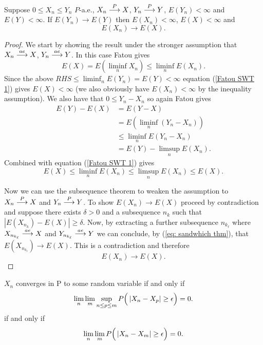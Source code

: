 \begin{theorem}
\label{thm: Probability Sandwich Theorem}
Suppose $0 \leq X_n \leq Y_n$ $P$-a.e.,  $X_n\overset{\small P} \longrightarrow X$,  $Y_n\overset{\small P} \longrightarrow Y$, $E(Y_n)<\infty$ and $E(Y)<\infty$. If  $E(Y_n) \rightarrow E(Y)$ then $E(X_n)<\infty$, $E(X)<\infty$ and 
\[E(X_n)\rightarrow E(X).\]
\end{theorem}
\begin{proof}

We start by  showing the result under the stronger assumption that $X_n\overset{\small ae} \longrightarrow X$,  $Y_n\overset{\small ae} \longrightarrow Y$. In this case Fatou gives
\begin{equation}
\label{Fatou SWT 1}
E(X) = E(\liminf_n X_n)\leq \liminf_n E(X_n).
\end{equation}
Since the above $ RHS \leq \liminf_n E(Y_n)=E(Y)<\infty$ equation (\ref{Fatou SWT 1}) gives $E(X)<\infty$ (we also obviously have $E(X_n)<\infty$ by the inequality assumption).
We also have that $0\leq Y_n -X_n$ so again Fatou gives
\begin{align*}
E(Y)-E(X) &= E(Y-X) \\
&= E(\liminf_n (Y_n-X_n)) \\
&\leq \liminf_n E(Y_n - X_n) \\
&= E(Y)-\limsup_n E(X_n). 
\end{align*}
Combined with equation (\ref{Fatou SWT 1}) gives
\begin{equation}
\label{eq: sandwhich thm}
E(X)\leq \liminf_n E(X_n)\leq \limsup_n E(X_n) \leq E(X).
\end{equation}

Now we can use the subsequence theorem to weaken the assumption to $X_n\overset{\small P} \longrightarrow X$ and  $Y_n\overset{\small P} \longrightarrow Y$.
To show $E(X_n)\rightarrow E(X)$ proceed by contradiction and suppose there exists $\delta>0$ and a subsequence $n_k$ such that $|E(X_{n_k})- E(X)|\geq \delta$. Now, by extracting a further subsequence $n_{k_\ell}$ where $X_{n_{k_\ell}}\overset{\small ae} \longrightarrow X$ and $Y_{n_{k_\ell}}\overset{\small ae} \longrightarrow Y$ we can conclude, by (\ref{eq: sandwhich thm}), that $E(X_{n_{k_\ell}})\rightarrow E(X).$ This is a contradiction and therefore 
\[
E(X_n)\rightarrow E(X).
\]
\end{proof}


\begin{theorem}
\label{cauchy for P}
$X_n$ converges in P to some random variable if and only if
\begin{equation}
\lim_{n}\lim_{m}  \sup_{n\leq p\leq m} P\Bigl(\, |X_n-X_p| \geq \epsilon \Bigr)=0.
\end{equation}
if and only if
\begin{equation}
\lim_{n}\lim_{m}   P\Bigl(\, |X_n-X_m| \geq \epsilon \Bigr)=0.
\end{equation}
\end{theorem}




